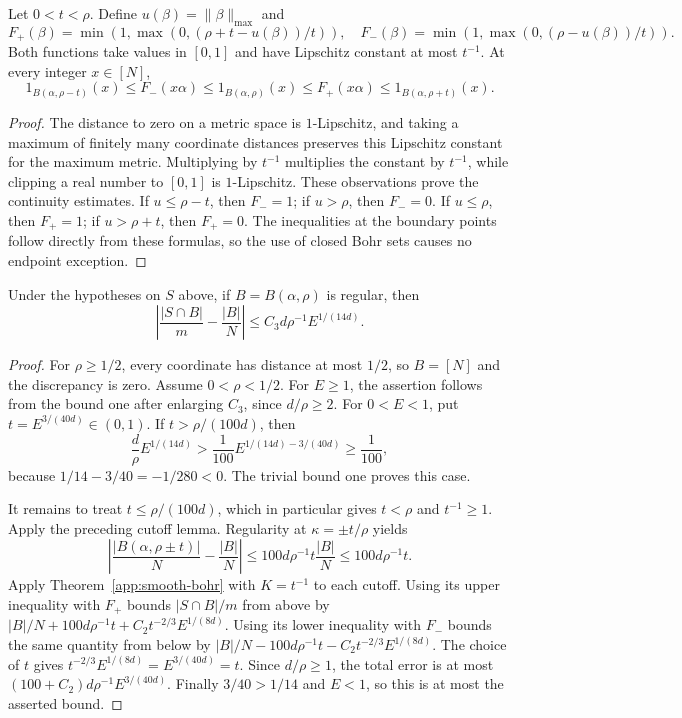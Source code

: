 \begin{lemma}
\label{app:bohr-cutoffs}
\leanok
Let $0<t<\rho$.  Define $u(\beta)=\|\beta\|_{\max}$ and
\[
 F_+(\beta)=\min(1,\max(0,(\rho+t-u(\beta))/t)),\quad
 F_-(\beta)=\min(1,\max(0,(\rho-u(\beta))/t)).
\]
Both functions take values in $[0,1]$ and have Lipschitz constant at most
$t^{-1}$.  At every integer $x\in[N]$,
\[
 1_{B(\alpha,\rho-t)}(x)\leq F_-(x\alpha)
 \leq1_{B(\alpha,\rho)}(x)
 \leq F_+(x\alpha)\leq1_{B(\alpha,\rho+t)}(x).
\]
\end{lemma}
\begin{proof}
The distance to zero on a metric space is $1$-Lipschitz, and taking a
maximum of finitely many coordinate distances preserves this Lipschitz
constant for the maximum metric.  Multiplying by $t^{-1}$ multiplies the
constant by $t^{-1}$, while clipping a real number to $[0,1]$ is
$1$-Lipschitz.  These observations prove the continuity estimates.
If $u\leq\rho-t$, then $F_-=1$; if $u>\rho$, then $F_-=0$.
If $u\leq\rho$, then $F_+=1$; if $u>\rho+t$, then $F_+=0$.
The inequalities at the boundary points follow directly from these
formulas, so the use of closed Bohr sets causes no endpoint exception.
\end{proof}

\begin{theorem}
\label{app:regular-bohr-equidistribution}
\leanok
{}
Under the hypotheses on $S$ above, if $B=B(\alpha,\rho)$ is regular, then
\[
 \left|\frac{|S\cap B|}{m}-\frac{|B|}{N}\right|
 \leq C_3 d\rho^{-1}E^{1/(14d)}.
\]
\end{theorem}
\begin{proof}
For $\rho\geq1/2$, every coordinate has distance at most $1/2$, so
$B=[N]$ and the discrepancy is zero.  Assume $0<\rho<1/2$.
For $E\geq1$, the assertion follows from the bound one after enlarging
$C_3$, since $d/\rho\geq2$.
For $0<E<1$, put $t=E^{3/(40d)}\in(0,1)$.
If $t>\rho/(100d)$, then
\[
 \frac d\rho E^{1/(14d)}
 >\frac1{100}E^{1/(14d)-3/(40d)}\geq\frac1{100},
\]
because $1/14-3/40=-1/280<0$.  The trivial bound one proves this case.

It remains to treat $t\leq\rho/(100d)$, which in particular gives
$t<\rho$ and $t^{-1}\geq1$.  Apply the preceding cutoff lemma.
Regularity at $\kappa=\pm t/\rho$ yields
\[
 \left|\frac{|B(\alpha,\rho\pm t)|}{N}-\frac{|B|}{N}\right|
 \leq100d\rho^{-1}t\frac{|B|}{N}\leq100d\rho^{-1}t.
\]
Apply Theorem~\ref{app:smooth-bohr} with $K=t^{-1}$ to each cutoff.
Using its upper inequality with $F_+$ bounds $|S\cap B|/m$ from above by
$|B|/N+100d\rho^{-1}t+C_2t^{-2/3}E^{1/(8d)}$.
Using its lower inequality with $F_-$ bounds the same quantity from below
by $|B|/N-100d\rho^{-1}t-C_2t^{-2/3}E^{1/(8d)}$.
The choice of $t$ gives
$t^{-2/3}E^{1/(8d)}=E^{3/(40d)}=t$.
Since $d/\rho\geq1$, the total error is at most
$(100+C_2)d\rho^{-1}E^{3/(40d)}$.
Finally $3/40>1/14$ and $E<1$, so this is at most the asserted bound.
\end{proof}

